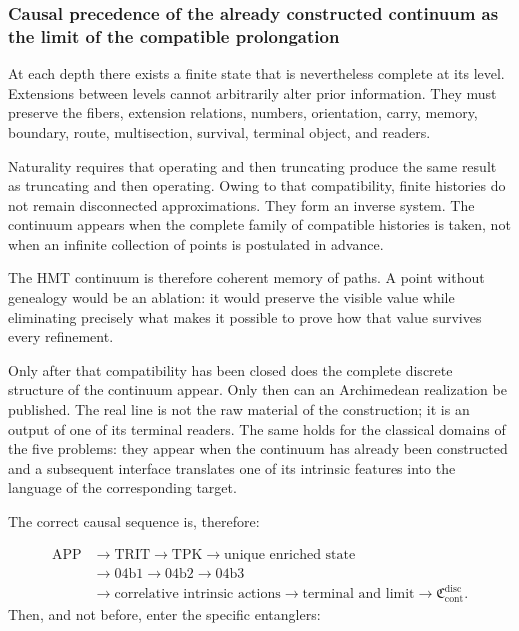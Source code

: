 \subsubsection{Causal precedence of the already constructed continuum as the limit of the compatible prolongation}
At each depth there exists a finite state that is nevertheless complete at its level. Extensions between levels cannot arbitrarily alter prior information. They must preserve the fibers, extension relations, numbers, orientation, carry, memory, boundary, route, multisection, survival, terminal object, and readers.\par
Naturality requires that operating and then truncating produce the same result as truncating and then operating. Owing to that compatibility, finite histories do not remain disconnected approximations. They form an inverse system. The continuum appears when the complete family of compatible histories is taken, not when an infinite collection of points is postulated in advance.\par
The HMT continuum is therefore coherent memory of paths. A point without genealogy would be an ablation: it would preserve the visible value while eliminating precisely what makes it possible to prove how that value survives every refinement.\par
Only after that compatibility has been closed does the complete discrete structure of the continuum appear. Only then can an Archimedean realization be published. The real line is not the raw material of the construction; it is an output of one of its terminal readers. The same holds for the classical domains of the five problems: they appear when the continuum has already been constructed and a subsequent interface translates one of its intrinsic features into the language of the corresponding target.\par
The correct causal sequence is, therefore:\par
\[
\begin{aligned}
\mathrm{APP}
&\longrightarrow \mathrm{TRIT}
\longrightarrow \mathrm{TPK}
\longrightarrow \text{unique enriched state}\\
&\longrightarrow 04\mathrm b1
\longrightarrow 04\mathrm b2
\longrightarrow 04\mathrm b3\\
&\longrightarrow \text{correlative intrinsic actions}
\longrightarrow \text{terminal and limit}
\longrightarrow \mathfrak C_{\mathrm{cont}}^{\mathrm{disc}}.
\end{aligned}
\]
Then, and not before, enter the specific entanglers:\par
